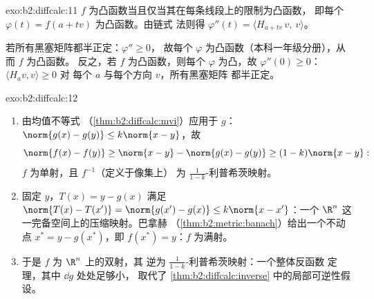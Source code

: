 \begin{solution}{exo:b2:diffcalc:11}
$f$ 为凸函数当且仅当其在每条线段上的限制为凸函数，
即每个 $\varphi(t) = f(a + tv)$ 为凸函数。由链式
法则得 $\varphi''(t) = \langle H_{a+tv}\,v,\ v\rangle$。

若所有黑塞矩阵都半正定：$\varphi'' \geq 0$，
故每个 $\varphi$ 为凸函数（本科一年级分册），从而 $f$ 为凸函数。
反之，若 $f$ 为凸函数，则每个 $\varphi$ 为凸，故
$\varphi''(0) \geq 0$：$\langle H_a v, v\rangle \geq 0$ 对
每个 $a$ 与每个方向 $v$，所有黑塞矩阵
都半正定。
\end{solution}

\begin{solution}{exo:b2:diffcalc:12}
\begin{enumerate}
  \item 由均值不等式
        （\cref{thm:b2:diffcalc:mvi}）应用于 $g$：
        $\norm{g(x) - g(y)} \leq k\norm{x-y}$，故
        \[
        \norm{f(x) - f(y)} \geq \norm{x - y} - \norm{g(x) -
        g(y)} \geq (1 - k)\norm{x - y} :
        \]
        $f$ 为单射，且 $f^{-1}$（定义于像集上）
        为 $\frac{1}{1-k}$-利普希茨映射。
  \item 固定 $y$，$T(x) = y - g(x)$ 满足 $\norm{T(x) -
        T(x')} = \norm{g(x') - g(x)} \leq k\norm{x - x'}$：一个
        $\R^n$ 这一完备空间上的压缩映射。巴拿赫
        （\cref{thm:b2:metric:banach}）给出一个不动点 $x^*
        = y - g(x^*)$，即 $f(x^*) = y$：$f$ 为满射。
  \item 于是 $f$ 为 $\R^n$ 上的双射，其
        逆为 $\frac{1}{1-k}$-利普希茨映射：一个整体反函数
        定理，其中 $\dd g$ 处处足够小，
        取代了
        \cref{thm:b2:diffcalc:inverse} 中的局部可逆性假设。
\end{enumerate}
\end{solution}

